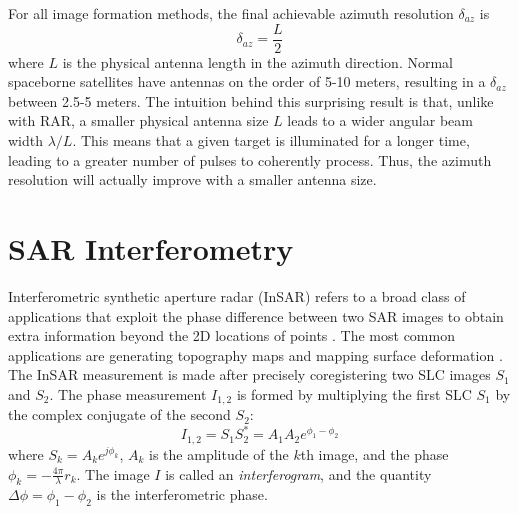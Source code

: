 For all image formation methods, the final achievable azimuth resolution $\delta_{az}$ is
\begin{equation}
	\delta_{az} = \frac{L}{2}
\end{equation}
where $L$ is the physical antenna length in the azimuth direction.
Normal spaceborne satellites have antennas on the order of 5-10 meters, resulting in a $\delta_{az} $ between 2.5-5 meters.
The intuition behind this surprising result is that, unlike with RAR, a smaller physical antenna size $L$ leads to a wider angular beam width $ \lambda / L$. This means that a given target is illuminated for a longer time, leading to a greater number of pulses to coherently process. Thus, the azimuth resolution will actually improve with a smaller antenna size.



\section{SAR Interferometry}

Interferometric synthetic aperture radar (InSAR) refers to a broad class of applications that exploit the phase difference between two SAR images to obtain extra information beyond the 2D locations of points \citep{Bamler1998SyntheticApertureRadar}. The most common applications are generating topography maps \citep{Graham1974SyntheticInterferometerRadar, Zebker1986TopographicMappingInterferometric} and mapping surface deformation \citep{Goldstein1987InterferometricRadarMeasurement, Gabriel1989MappingSmallElevation, Li1990StudiesMultibaselineSpaceborne, Massonnet1993DisplacementFieldLanders, Rosen2000SyntheticApertureRadar}. 
The InSAR measurement is made after precisely coregistering two SLC images $S_1$ and $S_2$. The phase measurement $I_{1,2}$ is formed by multiplying the first SLC $S_1$ by the complex conjugate of the second $S_2$: 
\begin{equation}
	I_{1,2} = S_1 S_2^{*} = A_1 A_2 e^{\phi_1 - \phi_2}  \label{eq:insar-conj-mult}
\end{equation}
where $S_k = A_k e^{j \phi_k}$, $A_k$ is the amplitude of the $k$th image, and the phase $\phi_k = -\frac{4 \pi}{\lambda} r_k$. The image $I$ is called an \emph{interferogram},  and the quantity $\Delta \phi = \phi_1 - \phi_2$ is the interferometric phase.


